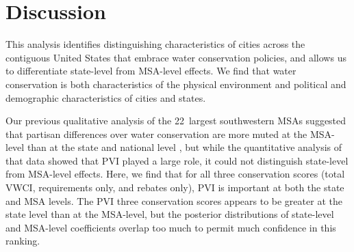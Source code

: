 \documentclass[draft,linenumbers]{agujournal}
\begin{document}



\section{Discussion}

This analysis identifies distinguishing characteristics of cities across the
contiguous United States that embrace water conservation policies, and allows us
to differentiate state-level from MSA-level effects. We find that water
conservation is  both 
characteristics of the physical environment and
 political and demographic
characteristics of cities and states.

Our previous qualitative analysis of the 22~largest southwestern MSAs suggested
that partisan differences over water conservation are more muted at the
MSA-level than at the state and national level \citep{hess:drought:2016}, but
while the quantitative analysis of that data showed that PVI played a large
role, it could not distinguish state-level from MSA-level effects.
Here, we find that for all three conservation scores (total VWCI, requirements
only, and rebates only), PVI is important at both the state and MSA levels.
The
%
PVI
three conservation scores appears to be
greater at the state level than at the MSA-level, but the posterior
distributions of state-level and MSA-level coefficients overlap too much to
permit much confidence in this ranking.
\end{document}
